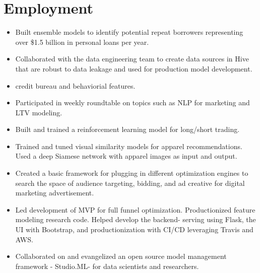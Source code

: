 \documentclass[11pt,a4paper,unicode]{moderncv}
\begin{document}
\vspace*{-6mm}
\maketitle
\vspace*{-6mm}

\section{Employment}

\vspace{-.1cm}
\cvline{}
{\begin{itemize} 
	  \item Built ensemble models to identify potential repeat borrowers representing over \$1.5 billion in personal loans per year. 
	  \item Collaborated with the data engineering team to create data sources in Hive that are robust to data leakage and used for production model development.
	  \item credit bureau and behaviorial features.
	  \item Participated in weekly roundtable on topics such as NLP for marketing and LTV modeling. 	  
\end{itemize}}
\vspace{-.5cm}


\vspace{-.1cm}
\cvline{}
{\begin{itemize} 
	  \item Built and trained a reinforcement learning model for long/short trading.
	  \item Trained and tuned visual similarity models for apparel recommendations. Used a deep Siamese network with apparel images as input and output. 
	  \item Created a basic framework for plugging in different optimization engines to search the space of audience targeting, bidding, and ad creative for digital marketing advertisement.  
	  \item Led development of MVP for full funnel optimization. Productionized feature modeling research code. Helped develop the backend- serving using Flask, the UI with Bootstrap, and productionization with CI/CD leveraging Travis and AWS. 
	  \item Collaborated on and evangelized an open source model management framework - Studio.ML- for data scientists and researchers.  
\end{itemize}}
\vspace{-.5cm}
\end{document}
